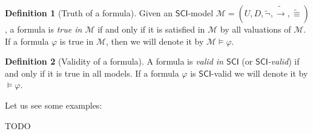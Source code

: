 \documentclass{article}
\theoremstyle{definition}
\newtheorem{definition}{Definition}[section]
\newcommand*{\id}{\equiv}
\newcommand*{\ra}{\rightarrow}
\newcommand{\SCI}{$\mathsf{SCI}$\xspace}
\begin{document}
\begin{definition}[Truth of a formula]
    Given an \SCI-model $\mathcal{M} = (U, D, \tilde{\lnot}, \tilde{\ra}, \tilde{\id})$, a formula is \emph{true in $\mathcal{M}$} if and only if it is satisfied in $\mathcal{M}$ by all valuations of $\mathcal{M}$. If a formula $\varphi$ is true in $\mathcal{M}$, then we will denote it by $\mathcal{M} \models \varphi$.
\end{definition}

\begin{definition}[Validity of a formula]
    A formula is \emph{valid in \SCI} (or \emph{\SCI-valid}) if and only if it is true in all models. If a formula $\varphi$ is \SCI-valid we will denote it by $ \models \varphi$.
\end{definition}

Let us see some examples:

TODO
\end{document}
